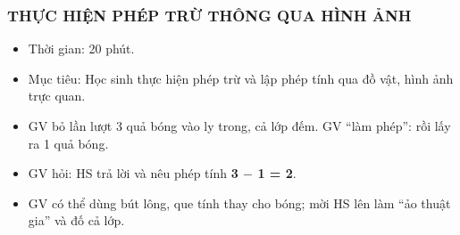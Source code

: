 \documentclass[../main.tex]{subfiles}
\begin{document}
\subsubsection{THỰC HIỆN PHÉP TRỪ THÔNG QUA HÌNH ẢNH}
\begin{hd}
    \begin{itemize}
        \item Thời gian: 20 phút.
        \item Mục tiêu: Học sinh thực hiện phép trừ và lập phép tính qua đồ vật, hình ảnh trực quan.
    \end{itemize}
\end{hd}
\begin{itemize}
    \item[-] GV bỏ lần lượt 3 quả bóng vào ly trong, cả lớp đếm. GV “làm phép”:  rồi lấy ra 1 quả bóng.
    \item[-] GV hỏi:  HS trả lời và nêu phép tính \textbf{3 $-$ 1 = 2}.
    \item[-] GV có thể dùng bút lông, que tính thay cho bóng; mời HS lên làm “ảo thuật gia” và đố cả lớp.
\end{itemize}
\end{document}
